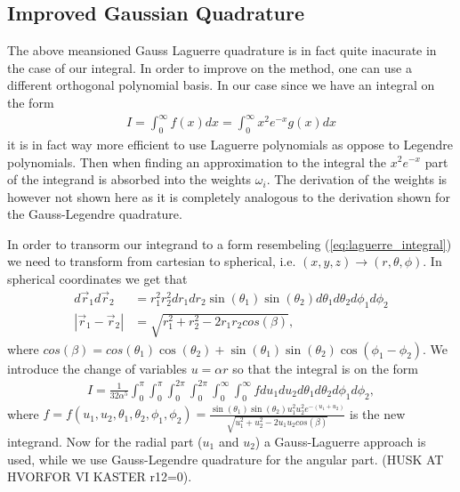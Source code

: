 \documentclass[twocolumn]{aastex62}
\begin{document}
\subsection{Improved Gaussian Quadrature}
The above meansioned Gauss Laguerre quadrature is in fact quite inacurate in the case of our integral. In order to improve on the method, one can use a different orthogonal polynomial basis. In our case since we have an integral on the form
\begin{align}
	I = \int^\infty_0 f(x)dx = \int^\infty_0x^2e^{-x}g(x) dx
	\label{eq:laguerre_integral}
\end{align}
it is in fact way more efficient to use Laguerre polynomials as oppose to Legendre polynomials. Then when finding an approximation to the integral the $x^2e^{-x}$ part of the integrand is absorbed into the weights $\omega_i$. The derivation of the weights is however not shown here as it is completely analogous to the derivation shown for the Gauss-Legendre quadrature.

In order to transorm our integrand to a form resembeling (\ref{eq:laguerre_integral}) we need to transform from cartesian to spherical, i.e. $(x, y, z)\to(r, \theta, \phi)$. In spherical coordinates we get that 
\begin{align}
	d\vec{r}_1d\vec{r}_2 &= r_1^2r_2^2 dr_1dr_2\sin(\theta_1)\sin(\theta_2)d\theta_1d\theta_2d\phi_1d\phi_2\\
	|\vec{r}_1 - \vec{r}_2| &= \sqrt{r_1^2 + r_2^2 - 2r_1r_2cos(\beta)},
\end{align}
where $cos(\beta) = cos(\theta_1)\cos(\theta_2) + \sin(\theta_1)\sin(\theta_2)\cos(\phi_1 - \phi_2)$.
We introduce the change of variables $u = \alpha r$ so that the integral is on the form
\begin{align}
	I = \frac{1}{32 \alpha^5} \int^\pi_0\int^{\pi}_0\int^{2\pi}_0\int^{2\pi}_0\int^\infty_0\int^\infty_0 fdu_1du_2d\theta_1d\theta_2d\phi_1d\phi_2,
\end{align}
where $f = f(u_1, u_2, \theta_1, \theta_2, \phi_1, \phi_2) = \frac{\sin
	(\theta_1)\sin(\theta_2)u_1^2u_2^2e^{-(u_1+u_2)}}{\sqrt{u_1^2 + u_2^2 - 2u_1u_2cos(\beta)}}$ is the new integrand.
Now for the radial part ($u_1$ and $u_2$) a Gauss-Laguerre approach is used, while we use Gauss-Legendre quadrature for the angular part. 
(HUSK AT HVORFOR VI KASTER r12=0).
\end{document}
